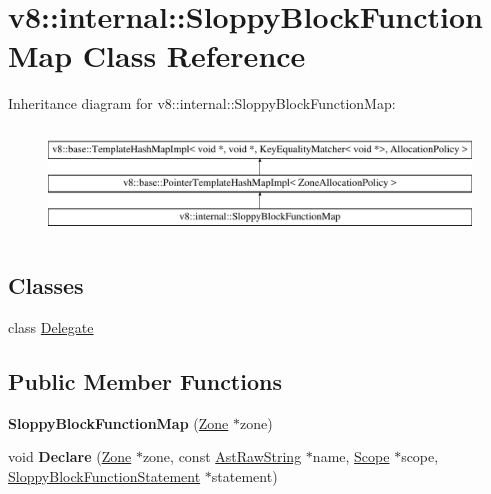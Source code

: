 \hypertarget{classv8_1_1internal_1_1SloppyBlockFunctionMap}{}\section{v8\+:\+:internal\+:\+:Sloppy\+Block\+Function\+Map Class Reference}
\label{classv8_1_1internal_1_1SloppyBlockFunctionMap}
Inheritance diagram for v8\+:\+:internal\+:\+:Sloppy\+Block\+Function\+Map\+:\begin{figure}[H]
\begin{center}
\leavevmode
\includegraphics[height=2.891566cm]{classv8_1_1internal_1_1SloppyBlockFunctionMap}
\end{center}
\end{figure}
\subsection*{Classes}
\begin{DoxyCompactItemize}
\item 
class \mbox{\hyperlink{classv8_1_1internal_1_1SloppyBlockFunctionMap_1_1Delegate}{Delegate}}
\end{DoxyCompactItemize}
\subsection*{Public Member Functions}
\begin{DoxyCompactItemize}
\item 
\mbox{\label{classv8_1_1internal_1_1SloppyBlockFunctionMap_a5c2875ca598de81f90f38b7237b39dbd}} 
{\bfseries Sloppy\+Block\+Function\+Map} (\mbox{\hyperlink{classv8_1_1internal_1_1Zone}{Zone}} $\ast$zone)
\item 
\mbox{\label{classv8_1_1internal_1_1SloppyBlockFunctionMap_ad8b920bc92c7c21c99db928befa0694c}} 
void {\bfseries Declare} (\mbox{\hyperlink{classv8_1_1internal_1_1Zone}{Zone}} $\ast$zone, const \mbox{\hyperlink{classv8_1_1internal_1_1AstRawString}{Ast\+Raw\+String}} $\ast$name, \mbox{\hyperlink{classv8_1_1internal_1_1Scope}{Scope}} $\ast$scope, \mbox{\hyperlink{classv8_1_1internal_1_1SloppyBlockFunctionStatement}{Sloppy\+Block\+Function\+Statement}} $\ast$statement)
\end{DoxyCompactItemize}
